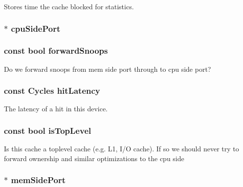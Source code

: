 \label{classBaseCache_ae1148c48e3f5a892c0576b7e10eec8d0}
Stores time the cache blocked for statistics. \hypertarget{classBaseCache_a14913ffff181227d085f25a95e6ada42}{
\subsubsection[{cpuSidePort}]{$\ast$ {\bf cpuSidePort}}}
\label{classBaseCache_a14913ffff181227d085f25a95e6ada42}
\hypertarget{classBaseCache_ac8d6ebb7f62e1afe78ddc7c774316d66}{
\subsubsection[{forwardSnoops}]{\setlength{\rightskip}{0pt plus 5cm}const bool {\bf forwardSnoops}}}
\label{classBaseCache_ac8d6ebb7f62e1afe78ddc7c774316d66}
Do we forward snoops from mem side port through to cpu side port? \hypertarget{classBaseCache_a4075fdc5720f8f0f57c379c396e74718}{
\subsubsection[{hitLatency}]{\setlength{\rightskip}{0pt plus 5cm}const {\bf Cycles} {\bf hitLatency}}}
\label{classBaseCache_a4075fdc5720f8f0f57c379c396e74718}
The latency of a hit in this device. \hypertarget{classBaseCache_a9d8582d06c3d2f59711d1bbf7d383df3}{
\subsubsection[{isTopLevel}]{\setlength{\rightskip}{0pt plus 5cm}const bool {\bf isTopLevel}}}
\label{classBaseCache_a9d8582d06c3d2f59711d1bbf7d383df3}
Is this cache a toplevel cache (e.g. L1, I/O cache). If so we should never try to forward ownership and similar optimizations to the cpu side \hypertarget{classBaseCache_af29f0c640654a651bf26558b4b39623b}{
\subsubsection[{memSidePort}]{$\ast$ {\bf memSidePort}}}
